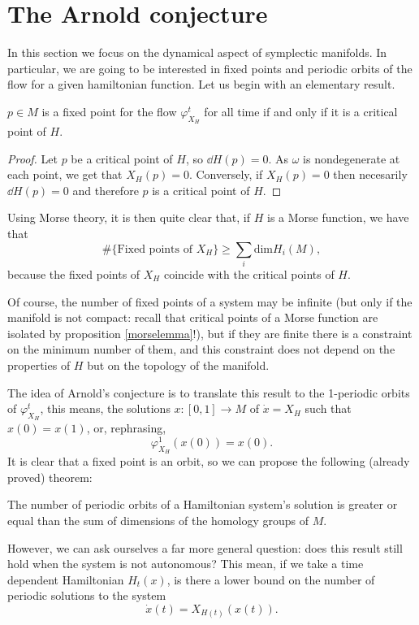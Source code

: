 \section{The Arnold conjecture}

In this section we focus on the dynamical aspect of symplectic manifolds. In particular, we are going to be interested in fixed points and periodic orbits of the flow for a given hamiltonian function. Let us begin with an elementary result.

\begin{prop}
$p \in M$ is a fixed point for the flow $\varphi_{X_H}^t$ for all time if and only if it is a critical point of $H$.
\end{prop}

\begin{proof}
Let $p$ be a critical point of $H$, so $\dd H(p) = 0$. As $\omega$ is nondegenerate at each point, we get that $X_H(p) = 0$. Conversely, if $X_H(p) = 0$ then necesarily $\dd H(p) = 0$ and therefore $p$ is a critical point of $H$.
\end{proof}

Using Morse theory, it is then quite clear that, if $H$ is a Morse function, we have that
$$\# \{\text{Fixed points of } X_H\} \geq \sum_i \text{dim}H_i(M) ,$$
because the fixed points of $X_H$ coincide with the critical points of $H$.

Of course, the number of fixed points of a system may be infinite (but only if the manifold is not compact: recall that critical points of a Morse function are isolated by proposition \ref{morselemma}!), but if they are finite there is a constraint on the minimum number of them, and this constraint does not depend on the properties of $H$ but on the topology of the manifold.

The idea of Arnold's conjecture is to translate this result to the 1-periodic orbits of $\varphi_{X_H}^t$, this means, the solutions $x : [0,1] \rightarrow M$ of $\dot{x} = X_H$ such that $x(0) = x(1)$, or, rephrasing,
$$\varphi_{X_H}^1(x(0)) = x(0) .$$
It is clear that a fixed point is an orbit, so we can propose the following (already proved) theorem:

\begin{theo}
The number of periodic orbits of a Hamiltonian system's solution is greater or equal than the sum of dimensions of the homology groups of $M$.
\end{theo}

However, we can ask ourselves a far more general question: does this result still hold when the system is not autonomous? This mean, if we take a time dependent Hamiltonian $H_t(x)$, is there a lower bound on the number of periodic solutions to the system
$$\dot{x}(t) = X_{H(t)}(x(t)) .$$


